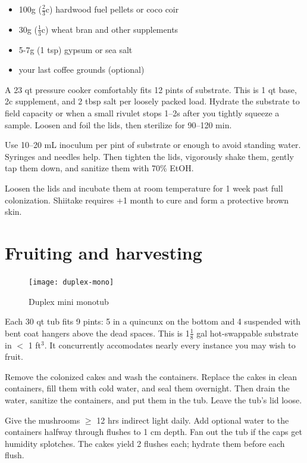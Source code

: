 \documentclass{article}
\begin{document}
\begin{itemize}
	\item 100g ($\frac{2}{3}$c) hardwood fuel pellets or coco coir
	\item 30g ($\frac{1}{3}$c) wheat bran and other supplements
	\item 5-7g (1 tsp) gypsum or sea salt
	\item your last coffee grounds (optional)
\end{itemize}

A 23 qt pressure cooker comfortably fits 12 pints of substrate.
This is 1 qt base, 2c supplement, and 2 tbsp salt per loosely packed load.
Hydrate the substrate to field capacity or when a small rivulet stops 1--2s after you tightly squeeze a sample.
Loosen and foil the lids, then sterilize for 90--120 min.

Use 10--20 mL inoculum per pint of substrate or enough to avoid standing water.
Syringes and needles help.
Then tighten the lids, vigorously shake them, gently tap them down, and sanitize them with 70\% EtOH.

Loosen the lids and incubate them at room temperature for 1 week past full colonization.
Shiitake requires +1 month to cure and form a protective brown skin.


\section*{Fruiting and harvesting}

\begin{figure}
	\texttt{[image: duplex-mono]}
	\caption{Duplex mini monotub}
\end{figure}

Each 30 qt tub fits 9 pints: 5 in a quincunx on the bottom and 4 suspended with bent coat hangers above the dead spaces.
This is 1$\frac{1}{8}$ gal hot-swappable substrate in $<$ 1 ft${^3}$.
It concurrently accomodates nearly every instance you may wish to fruit.

Remove the colonized cakes and wash the containers.
Replace the cakes in clean containers, fill them with cold water, and seal them overnight.
Then drain the water, sanitize the containers, and put them in the tub.
Leave the tub's lid loose.

Give the mushrooms $\geq$ 12 hrs indirect light daily.
Add optional water to the containers halfway through flushes to 1 cm depth.
Fan out the tub if the caps get humidity splotches.
The cakes yield 2 flushes each; hydrate them before each flush.
\end{document}
